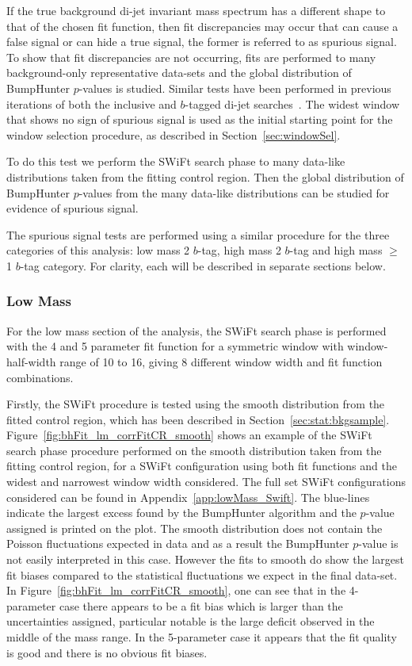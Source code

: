 If the true background di-jet invariant mass spectrum has a different shape to that of the chosen fit function, then fit discrepancies may occur
that can cause a false signal or can hide a true signal, the former is referred to as spurious signal.
To show that fit discrepancies are not occurring, fits are performed to many background-only representative
data-sets and the global distribution of {\sc BumpHunter} $p$-values is studied.
Similar tests have been performed in previous iterations of both the inclusive and $b$-tagged di-jet searches~\cite{highmass,2015Moriondsupport,2016ICHEPsupport}.
The widest window that shows no sign of spurious signal is used as the initial starting point for the window selection procedure, as described in Section~\ref{sec:windowSel}.
 
To do this test we perform the SWiFt search phase to many data-like distributions taken from the fitting control region.
Then the global distribution of {\sc BumpHunter} $p$-values from the many data-like distributions can be studied for evidence of spurious signal.

The spurious signal tests are performed using a similar procedure for the three categories of this analysis:
low mass 2 $b$-tag, high mass 2 $b$-tag and high mass $\geq$1 $b$-tag category.
For clarity, each will be described in separate sections below.

\subsubsection{Low Mass}
\label{sec:lowmass_spuriousSignal}

For the low mass section of the analysis,
the SWiFt search phase is performed with the 4 and 5 parameter fit function for a symmetric window with window-half-width range of 10 to 16,
giving 8 different window width and fit function combinations.

Firstly, the SWiFt procedure is tested using the smooth distribution from the fitted control region,
which has been described in Section~\ref{sec:stat:bkgsample}.
Figure~\ref{fig:bhFit_lm_corrFitCR_smooth} shows an example of the SWiFt search phase procedure
performed on the smooth distribution taken from the fitting control region,
for a SWiFt configuration using both fit functions and the widest and narrowest window width considered.
The full set SWiFt configurations considered can be found in Appendix~\ref{app:lowMass_Swift}.
The blue-lines indicate the largest excess found by the {\sc BumpHunter} algorithm and the $p$-value assigned is printed on the plot. 
The smooth distribution does not contain the Poisson fluctuations expected in data
and as a result the {\sc BumpHunter} $p$-value is not easily interpreted in this case.
However the fits to smooth do show the largest fit biases compared to the statistical fluctuations we expect in the final data-set.
In Figure~\ref{fig:bhFit_lm_corrFitCR_smooth},
one can see that in the 4-parameter case there appears to be a fit bias which is larger than the uncertainties assigned,
particular notable is the large deficit observed in the middle of the mass range.
In the 5-parameter case it appears that the fit quality is good and there is no obvious fit biases.
 
